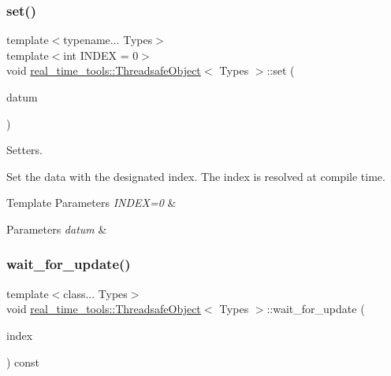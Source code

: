 \subsubsection{\texorpdfstring{set()}{set()}\hspace{0.1cm}{\footnotesize\ttfamily [2/2]}}
{\footnotesize\ttfamily template$<$typename... Types$>$ \\
template$<$int I\+N\+D\+EX = 0$>$ \\
void \hyperlink{classreal__time__tools_1_1ThreadsafeObject}{real\+\_\+time\+\_\+tools\+::\+Threadsafe\+Object}$<$ Types $>$\+::set (\begin{DoxyParamCaption}\item[{\hyperlink{classreal__time__tools_1_1ThreadsafeObject_afcbd77df1964d4fe606f1e776f1ff9b8}{Type}$<$ I\+N\+D\+EX $>$}]{datum }\end{DoxyParamCaption})}



Setters. 

Set the data with the designated index. The index is resolved at compile time.


\begin{DoxyTemplParams}{Template Parameters}
{\em I\+N\+D\+E\+X=0} & \\
\hline
\end{DoxyTemplParams}

\begin{DoxyParams}{Parameters}
{\em datum} & \\
\hline
\end{DoxyParams}
\mbox{\label{classreal__time__tools_1_1ThreadsafeObject_a85d7f9175a08a3440f9bb783fd4aa264}} 
\subsubsection{\texorpdfstring{wait\+\_\+for\+\_\+update()}{wait\_for\_update()}\hspace{0.1cm}{\footnotesize\ttfamily [1/3]}}
{\footnotesize\ttfamily template$<$class... Types$>$ \\
void \hyperlink{classreal__time__tools_1_1ThreadsafeObject}{real\+\_\+time\+\_\+tools\+::\+Threadsafe\+Object}$<$ Types $>$\+::wait\+\_\+for\+\_\+update (\begin{DoxyParamCaption}\item[{unsigned}]{index }\end{DoxyParamCaption}) const}



